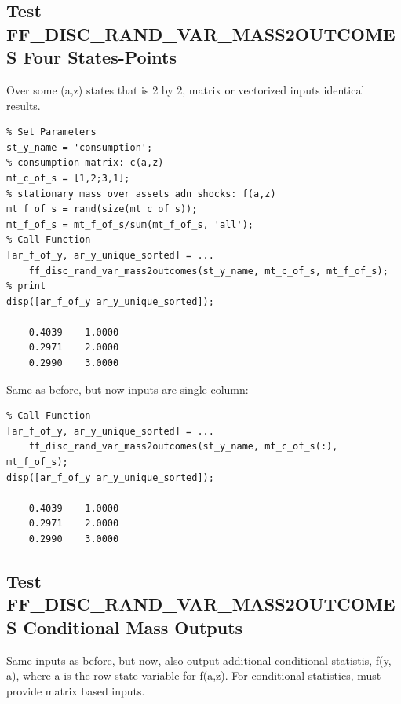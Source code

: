 \documentclass[
]{book}
\begin{document}
\hypertarget{test-ff_disc_rand_var_mass2outcomes-four-states-points}{%
\subsection{Test FF\_DISC\_RAND\_VAR\_MASS2OUTCOMES Four States-Points}\label{test-ff_disc_rand_var_mass2outcomes-four-states-points}}

Over some (a,z) states that is 2 by 2, matrix or vectorized inputs
identical results.

\begin{verbatim}
% Set Parameters
st_y_name = 'consumption';
% consumption matrix: c(a,z)
mt_c_of_s = [1,2;3,1];
% stationary mass over assets adn shocks: f(a,z)
mt_f_of_s = rand(size(mt_c_of_s));
mt_f_of_s = mt_f_of_s/sum(mt_f_of_s, 'all');
% Call Function
[ar_f_of_y, ar_y_unique_sorted] = ...
    ff_disc_rand_var_mass2outcomes(st_y_name, mt_c_of_s, mt_f_of_s);
% print
disp([ar_f_of_y ar_y_unique_sorted]);

    0.4039    1.0000
    0.2971    2.0000
    0.2990    3.0000
\end{verbatim}

Same as before, but now inputs are single column:

\begin{verbatim}
% Call Function
[ar_f_of_y, ar_y_unique_sorted] = ...
    ff_disc_rand_var_mass2outcomes(st_y_name, mt_c_of_s(:), mt_f_of_s);
disp([ar_f_of_y ar_y_unique_sorted]);

    0.4039    1.0000
    0.2971    2.0000
    0.2990    3.0000
\end{verbatim}

\hypertarget{test-ff_disc_rand_var_mass2outcomes-conditional-mass-outputs}{%
\subsection{Test FF\_DISC\_RAND\_VAR\_MASS2OUTCOMES Conditional Mass Outputs}\label{test-ff_disc_rand_var_mass2outcomes-conditional-mass-outputs}}

Same inputs as before, but now, also output additional conditional
statistis, f(y, a), where a is the row state variable for f(a,z). For
conditional statistics, must provide matrix based inputs.
\end{document}
